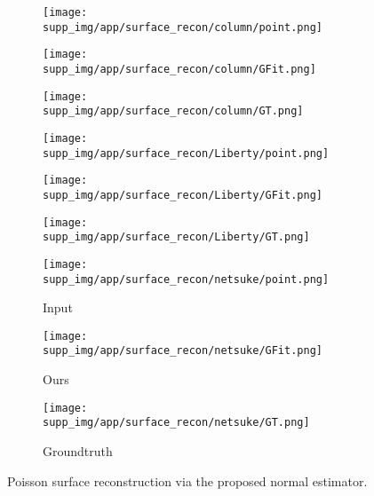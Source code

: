 \documentclass[runningheads]{llncs}
\begin{document}
\begin{figure}
\centering
  \begin{subfigure}{0.3\linewidth}
  \centering
    \texttt{[image: supp\_img/app/surface\_recon/column/point.png]}
\end{subfigure}
  \begin{subfigure}{0.3\linewidth}
  \centering
    \texttt{[image: supp\_img/app/surface\_recon/column/GFit.png]}
\end{subfigure}
  \begin{subfigure}{0.3\linewidth}
  \centering
    \texttt{[image: supp\_img/app/surface\_recon/column/GT.png]}
\end{subfigure}
  
    \begin{subfigure}{0.3\linewidth}
    \centering
    \texttt{[image: supp\_img/app/surface\_recon/Liberty/point.png]}
\end{subfigure}
  \begin{subfigure}{0.3\linewidth}
  \centering
    \texttt{[image: supp\_img/app/surface\_recon/Liberty/GFit.png]}
\end{subfigure}
  \begin{subfigure}{0.3\linewidth}
  \centering
    \texttt{[image: supp\_img/app/surface\_recon/Liberty/GT.png]}
\end{subfigure}
      \begin{subfigure}{0.3\linewidth}
      \centering
    \texttt{[image: supp\_img/app/surface\_recon/netsuke/point.png]}
    \caption{Input}
  \end{subfigure}
  \begin{subfigure}{0.3\linewidth}
  \centering
    \texttt{[image: supp\_img/app/surface\_recon/netsuke/GFit.png]}
    \caption{Ours}
  \end{subfigure}
  \begin{subfigure}{0.3\linewidth}
  \centering
    \texttt{[image: supp\_img/app/surface\_recon/netsuke/GT.png]}
    \caption{Groundtruth}
  \end{subfigure}
  
  \caption{Poisson surface reconstruction via the proposed normal estimator. 
}
  \label{fig:recon}
\end{figure}
\end{document}
